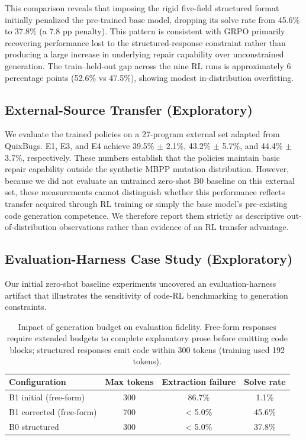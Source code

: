 \documentclass{article}
\begin{document}
This comparison reveals that imposing the rigid five-field structured format initially penalized the pre-trained base model, dropping its solve rate from 45.6\% to 37.8\% (a 7.8 pp penalty). This pattern is consistent with GRPO primarily recovering performance lost to the structured-response constraint rather than producing a large increase in underlying repair capability over unconstrained generation. The train--held-out gap across the nine RL runs is approximately 6 percentage points (52.6\% vs 47.5\%), showing modest in-distribution overfitting.

\subsection{External-Source Transfer (Exploratory)}
We evaluate the trained policies on a 27-program external set adapted from QuixBugs. E1, E3, and E4 achieve 39.5\% $\pm$ 2.1\%, 43.2\% $\pm$ 5.7\%, and 44.4\% $\pm$ 3.7\%, respectively. These numbers establish that the policies maintain basic repair capability outside the synthetic MBPP mutation distribution. However, because we did not evaluate an untrained zero-shot B0 baseline on this external set, these measurements cannot distinguish whether this performance reflects transfer acquired through RL training or simply the base model's pre-existing code generation competence. We therefore report them strictly as descriptive out-of-distribution observations rather than evidence of an RL transfer advantage.

\subsection{Evaluation-Harness Case Study (Exploratory)}
\label{sec:harness}
Our initial zero-shot baseline experiments uncovered an evaluation-harness artifact that illustrates the sensitivity of code-RL benchmarking to generation constraints.

\begin{table}[h]
\centering
\small
\begin{tabular}{l c c c}
\toprule
\textbf{Configuration} & \textbf{Max tokens} & \textbf{Extraction failure} & \textbf{Solve rate} \\
\midrule
B1 initial (free-form) & 300 & 86.7\% & 1.1\% \\
B1 corrected (free-form) & 700 & < 5.0\% & 45.6\% \\
B0 structured & 300 & < 5.0\% & 37.8\% \\
\bottomrule
\end{tabular}
\caption{Impact of generation budget on evaluation fidelity. Free-form responses require extended budgets to complete explanatory prose before emitting code blocks; structured responses emit code within 300 tokens (training used 192 tokens).}
\label{tab:truncation}
\end{table}
\end{document}

